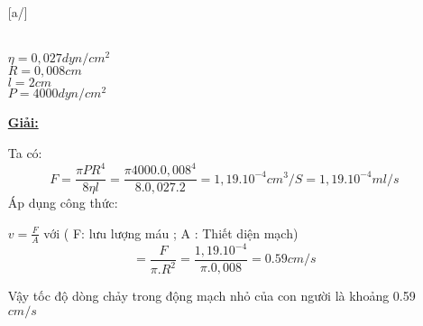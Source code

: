 \documentclass[12pt,a4paper]{article}
\begin{document}
\begin{enumerate} [a/]
\begin{flushleft}
		      \\
		      $\eta = 0,027 dyn/cm^2$
		      \\
		      $R= 0,008 cm$
		      \\
		      $l= 2 cm$
		      \\
		      $P= 4000 dyn/cm^2$
	      \end{flushleft}
	      \begin{center}
		      \textbf{\underline{Giải:}}
	      \end{center}
	      \begin{flushleft}
		      Ta có:
		      $$F=\frac{\pi PR^4}{8\eta l}=\frac{\pi 4000.0,008^4}{8.0,027.2}=1,19.10^{-4} cm^3/S=1,19.10^{-4} ml/s$$
		      Áp dụng công thức:
	      \end{flushleft}
	      \begin{center}
		      $v=\frac{F}{A}$ với ( F: lưu lượng máu ; A : Thiết diện mạch)
		      $$=\frac{F}{\pi.R^2}=\frac{1,19.10^{-4}}{\pi . 0,008}=0.59 cm/s$$
	      \end{center}
	      \begin{flushleft}
		      Vậy tốc độ dòng chảy trong động mạch nhỏ của con người là khoảng 0.59 $cm/s$
	      \end{flushleft}
\end{enumerate}

\newpage
\end{document}
